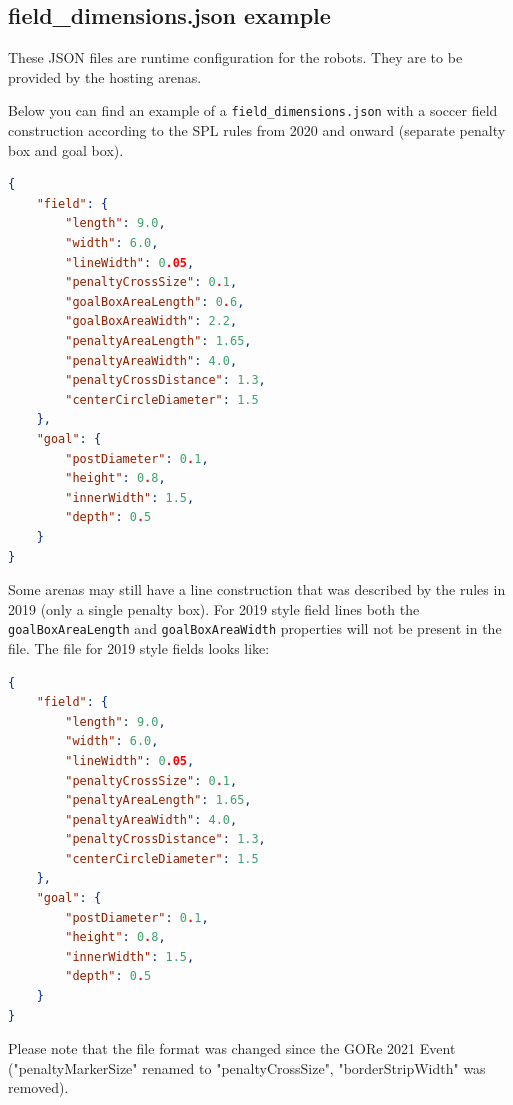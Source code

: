 \subsection{field\_dimensions.json example}
\label{sec:fielddimensionsjson}

These JSON files are runtime configuration for the robots. They are to be provided by the hosting arenas.

Below you can find an example of a \texttt{field\_dimensions.json} with a soccer field construction according to the SPL rules from 2020 and onward (separate penalty box and goal box). 

\begin{lstlisting}[language=json,firstnumber=1]
{
    "field": {
        "length": 9.0,
        "width": 6.0,
        "lineWidth": 0.05,
        "penaltyCrossSize": 0.1,
        "goalBoxAreaLength": 0.6,
        "goalBoxAreaWidth": 2.2,
        "penaltyAreaLength": 1.65,
        "penaltyAreaWidth": 4.0,
        "penaltyCrossDistance": 1.3,
        "centerCircleDiameter": 1.5
    },
    "goal": {
        "postDiameter": 0.1,
        "height": 0.8,
        "innerWidth": 1.5,
        "depth": 0.5
    }
}
\end{lstlisting}

Some arenas may still have a line construction that was described by the rules in 2019 (only a single penalty box). For 2019 style field lines both the \texttt{goalBoxAreaLength} and \texttt{goalBoxAreaWidth} properties will not be present in the file. The file for 2019 style fields looks like:

\begin{lstlisting}[language=json,firstnumber=1]
{
    "field": {
        "length": 9.0,
        "width": 6.0,
        "lineWidth": 0.05,
        "penaltyCrossSize": 0.1,
        "penaltyAreaLength": 1.65,
        "penaltyAreaWidth": 4.0,
        "penaltyCrossDistance": 1.3,
        "centerCircleDiameter": 1.5
    },
    "goal": {
        "postDiameter": 0.1,
        "height": 0.8,
        "innerWidth": 1.5,
        "depth": 0.5
    }
}
\end{lstlisting}

Please note that the file format was changed since the GORe 2021 Event ("penaltyMarkerSize" renamed to "penaltyCrossSize", "borderStripWidth" was removed).

